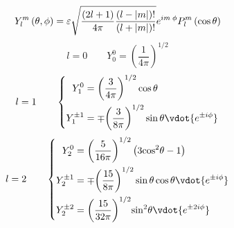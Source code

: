 \begin{enumerate}
  \begin{equation}
    Y_l^m\left( {\theta ,\phi } \right) = \varepsilon \sqrt {\frac{{\left( {2l + 1} \right)}}{{4\pi }}\frac{{\left( {l - \left| m \right|} \right)!}}{{\left( {l + \left| m \right|} \right)!}}} {e^{im{\kern 1pt} {\kern 1pt} \phi }}P_l^m\left( {\cos \theta } \right)
  \end{equation}
  \begin{equation}
    l = 0
    \qquad
    Y_0^0 = {\left( {\frac{1}{{4\pi }}} \right)^{1/2}}
  \end{equation}
  \begin{equation}
    l = 1
    \qquad
   \left\{ \begin{aligned}
Y_1^0 &= {\left( {\frac{3}{{4\pi }}} \right)^{1/2}}\cos \theta \\
Y_1^{ \pm 1} &=  \mp {\left( {\frac{3}{{8\pi }}} \right)^{1/2}}\sin \theta  \vdot {e^{ \pm i\phi }}
\end{aligned} \right.
  \end{equation}
  \begin{equation}
    l = 2
    \qquad
    \left\{ \begin{aligned}
Y_2^0 &= {\left( {\frac{5}{{16\pi }}} \right)^{1/2}}\left( {3{{\cos }^2}\theta  - 1} \right)\\
Y_2^{ \pm 1} &=  \mp {\left( {\frac{{15}}{{8\pi }}} \right)^{1/2}}\sin \theta \cos \theta  \vdot {e^{ \pm i\phi }}\\
Y_2^{ \pm 2} &= {\left( {\frac{{15}}{{32\pi }}} \right)^{1/2}}{\sin ^2}\theta  \vdot {e^{ \pm 2i\phi }}
\end{aligned} \right.
  \end{equation}
\end{enumerate}
